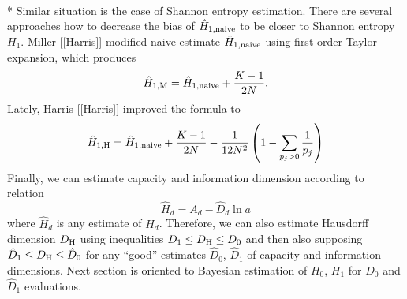 \\*
Similar situation is the case of Shannon entropy estimation. There are several approaches how to decrease the bias of $\hat{H}_{1,\mbox{\scriptsize{naive}}}$ to be closer to Shannon entropy $H_{1}$. Miller [\ref{Harris}] modified naive estimate $\hat{H}_{1,\mbox{\scriptsize{naive}}}$ using first order Taylor expansion, which produces
\begin{equation}
\label{eq:miller}
\hat{H}_{1,\mbox{\scriptsize{M}}}=\hat{H}_{1,\mbox{\scriptsize{naive}}} + \frac{K-1}{2N}.
\end{equation}
Lately, Harris [\ref{Harris}] improved the formula to
\begin{equation}
\label{eq:harris1h}
\hat{H}_{1,\mbox{\scriptsize{H}}}=\hat{H}_{1,\mbox{\scriptsize{naive}}} + \frac{K-1}{2N} - \frac{1}{12N^2} \left( 1 - \sum_{p_{j}>0}\frac{1}{p_{j}} \right)
\end{equation}
Finally, we can estimate capacity and information dimension according to relation
\begin{equation} 
\label{eq:hjednaest}
\hat{H}_{d}=A_{d} - \hat{D}_{d} \ln{a}
\end{equation} 
where $\hat{H}_{d}$ is any estimate of $H_{d}$. Therefore, we can also estimate Hausdorff dimension $D_{\mbox{\scriptsize{H}}}$ using inequalities $D_{1} \le D_{\mbox{\scriptsize{H}}} \le D_{0}$ and then also supposing $\hat{D}_{1} \le D_{\mbox{\scriptsize{H}}} \le \hat{D}_{0}$ for any ``good'' estimates $\hat{D}_{0}$, $\hat{D}_{1}$ of capacity and information dimensions. Next section is oriented to Bayesian estimation of $H_{0}$, $H_{1}$ for $\hat{D}_{0}$ and $\hat{D}_{1}$ evaluations.
